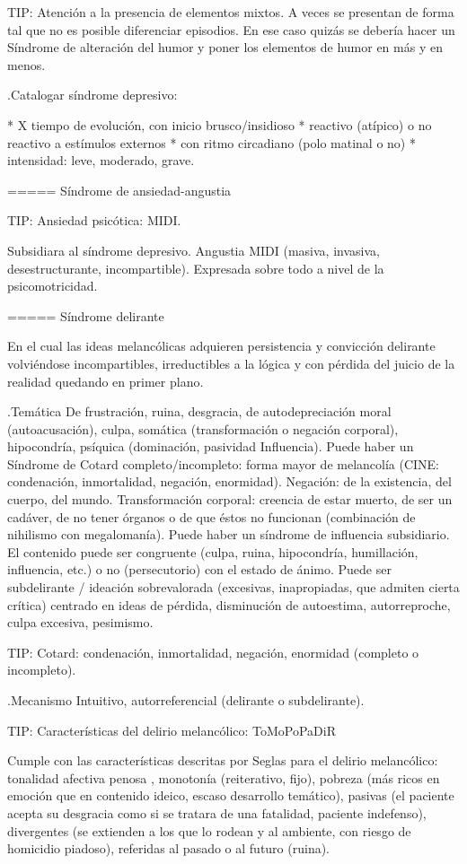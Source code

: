 \documentclass[encares.tex]{subfiles}
\begin{document}
TIP: Atención a la presencia de elementos mixtos. A veces se presentan de forma tal que no es posible diferenciar episodios. En ese caso quizás se debería hacer un Síndrome de alteración del humor y poner los elementos de humor en más y en menos.

.Catalogar síndrome depresivo:

* X tiempo de evolución, con inicio brusco/insidioso
* reactivo (atípico) o no reactivo a estímulos externos
* con ritmo circadiano (polo matinal o no)
* intensidad: leve, moderado, grave.


===== Síndrome de ansiedad-angustia

TIP: Ansiedad psicótica: MIDI.

Subsidiara al síndrome depresivo. Angustia MIDI (masiva, invasiva, desestructurante, incompartible). Expresada sobre todo a nivel de la psicomotricidad.

===== Síndrome delirante

En el cual las ideas melancólicas adquieren persistencia y convicción delirante volviéndose incompartibles, irreductibles a la lógica y con pérdida del juicio de la realidad quedando en primer plano.

.Temática
De frustración, ruina, desgracia, de autodepreciación moral (autoacusación), culpa, somática (transformación o negación corporal), hipocondría, psíquica (dominación, pasividad Influencia). Puede haber un Síndrome de Cotard completo/incompleto: forma mayor de melancolía (CINE: condenación, inmortalidad, negación, enormidad). Negación: de la existencia, del cuerpo, del mundo. Transformación corporal: creencia de estar muerto, de ser un cadáver, de no tener órganos o de que éstos no funcionan (combinación de nihilismo con megalomanía).
Puede haber un síndrome de influencia subsidiario.
El contenido puede ser congruente (culpa, ruina, hipocondría, humillación, influencia, etc.) o no (persecutorio) con el estado de ánimo.
Puede ser subdelirante / ideación sobrevalorada (excesivas, inapropiadas, que admiten cierta crítica) centrado en ideas de pérdida, disminución de autoestima, autorreproche, culpa excesiva, pesimismo.

TIP: Cotard: condenación, inmortalidad, negación, enormidad (completo o incompleto).

.Mecanismo
Intuitivo, autorreferencial (delirante o subdelirante).

TIP: Características del delirio melancólico: ToMoPoPaDiR

Cumple con las características descritas por Seglas para el delirio melancólico: tonalidad afectiva penosa , monotonía (reiterativo, fijo), pobreza (más ricos en emoción que en contenido ideico, escaso desarrollo temático), pasivas (el paciente acepta su desgracia como si se tratara de una fatalidad, paciente indefenso), divergentes (se extienden a los que lo rodean y al ambiente, con riesgo de homicidio piadoso), referidas al pasado o al futuro (ruina).
\end{document}
